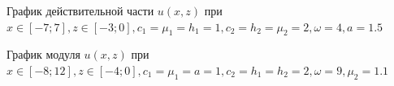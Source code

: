 \documentclass[a4paper, 12pt]{article}
\begin{document}
    \begin{figure}[h!]
    \noindent{}
    \caption{График действительной части $u(x,z)$ при $x \in [-7;7], z \in [-3;0], c_1=\mu_1=h_1=1, c_2=h_2=\mu_2=2, \omega =4, a=1.5$}
    \label{figCurves}
    \end{figure}  

    \begin{figure}[h!]
        \noindent{}
        \caption{График модуля $u(x,z)$ при $x \in [-8;12], z \in [-4;0], c_1=\mu_1=a=1, c_2=h_1=h_2=2, \omega =9, \mu_2=1.1$}
        \label{figCurves}
        \end{figure} 
\end{document}
